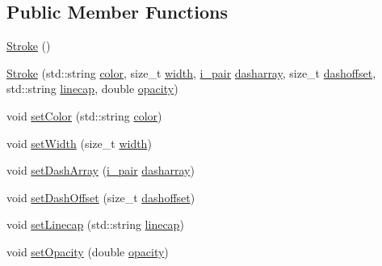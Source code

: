 \subsection*{Public Member Functions}
\begin{DoxyCompactItemize}
\item 
\mbox{\hyperlink{structvegra_1_1Stroke_a64be83054d51672b104626cefdb303d4}{Stroke}} ()
\item 
\mbox{\hyperlink{structvegra_1_1Stroke_a48ed9ac6ddee81297219d76534a71f8e}{Stroke}} (std\+::string \mbox{\hyperlink{structvegra_1_1Stroke_a407c59871f2ade9be29d2c5dfe28d21d}{color}}, size\+\_\+t \mbox{\hyperlink{structvegra_1_1Stroke_a95579e85bd704a94840674bbdee34304}{width}}, \mbox{\hyperlink{structvegra_1_1Stroke_af5a2b4ee71962d044ebb7a309b22bb8a}{i\+\_\+pair}} \mbox{\hyperlink{structvegra_1_1Stroke_a649828302bf54741b69ffeca87cbabbf}{dasharray}}, size\+\_\+t \mbox{\hyperlink{structvegra_1_1Stroke_aac202e47f5066fcd16cd4e1b1296214d}{dashoffset}}, std\+::string \mbox{\hyperlink{structvegra_1_1Stroke_a67a29aa2a553bf490f8556dd526fcfcf}{linecap}}, double \mbox{\hyperlink{structvegra_1_1Stroke_a1549534821eb8e96632f405af3c59d26}{opacity}})
\item 
void \mbox{\hyperlink{structvegra_1_1Stroke_a8404fd7b631e78bfb3021f026abbcc10}{set\+Color}} (std\+::string \mbox{\hyperlink{structvegra_1_1Stroke_a407c59871f2ade9be29d2c5dfe28d21d}{color}})
\item 
void \mbox{\hyperlink{structvegra_1_1Stroke_ae9aedb99ff7526cb922192b8faacd2bf}{set\+Width}} (size\+\_\+t \mbox{\hyperlink{structvegra_1_1Stroke_a95579e85bd704a94840674bbdee34304}{width}})
\item 
void \mbox{\hyperlink{structvegra_1_1Stroke_a440e67289da779bb73144d7b4a73a6f3}{set\+Dash\+Array}} (\mbox{\hyperlink{structvegra_1_1Stroke_af5a2b4ee71962d044ebb7a309b22bb8a}{i\+\_\+pair}} \mbox{\hyperlink{structvegra_1_1Stroke_a649828302bf54741b69ffeca87cbabbf}{dasharray}})
\item 
void \mbox{\hyperlink{structvegra_1_1Stroke_ae4581f2780ef60bdebc0af0d575c8c63}{set\+Dash\+Offset}} (size\+\_\+t \mbox{\hyperlink{structvegra_1_1Stroke_aac202e47f5066fcd16cd4e1b1296214d}{dashoffset}})
\item 
void \mbox{\hyperlink{structvegra_1_1Stroke_ac7e1d55eba440b657c5ec4d193fd8a0f}{set\+Linecap}} (std\+::string \mbox{\hyperlink{structvegra_1_1Stroke_a67a29aa2a553bf490f8556dd526fcfcf}{linecap}})
\item 
void \mbox{\hyperlink{structvegra_1_1Stroke_a5eae4ca7fa12a23911f7b959760f88fa}{set\+Opacity}} (double \mbox{\hyperlink{structvegra_1_1Stroke_a1549534821eb8e96632f405af3c59d26}{opacity}})

\end{DoxyCompactItemize}
